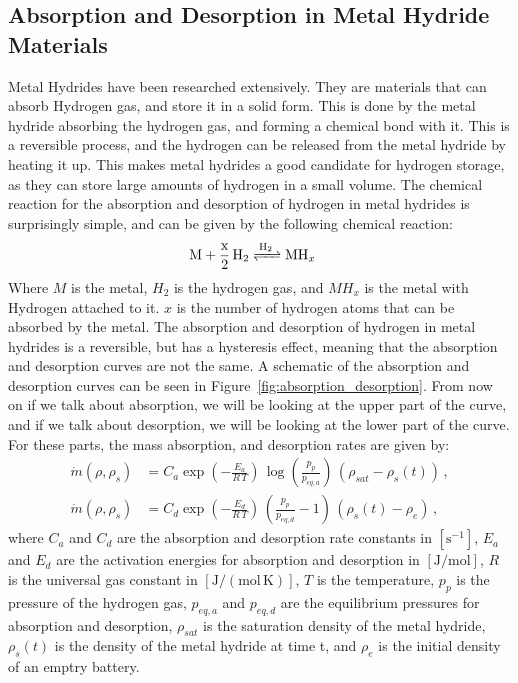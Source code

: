 \subsection{Absorption and Desorption in Metal Hydride Materials}\label{subsec:metal_hydrides}

Metal Hydrides have been researched extensively. They are materials that can absorb Hydrogen gas, and store it in a solid form. This is done by the metal hydride absorbing the hydrogen gas, and forming a chemical bond with it. This is a reversible process, and the hydrogen can be released from the metal hydride by heating it up. This makes metal hydrides a good candidate for hydrogen storage, as they can store large amounts of hydrogen in a small volume. The chemical reaction for the absorption and desorption of hydrogen in metal hydrides is surprisingly simple, and can be given by the following chemical reaction\cite{Sandrock1999}:
\begin{align*}
    \ce{M + \frac{x}{2} H2 &<=>[\ce{H2}] MH_x}
\end{align*}
Where $M$ is the metal, $H_2$ is the hydrogen gas, and $MH_x$ is the metal with Hydrogen attached to it. $x$ is the number of hydrogen atoms that can be absorbed by the metal. The absorption and desorption of hydrogen in metal hydrides is a reversible, but has a hysteresis effect, meaning that the absorption and desorption curves are not the same. A schematic of the absorption and desorption curves can be seen in Figure~\ref{fig:absorption_desorption}. From now on if we talk about absorption,  we will be looking at the upper part of the curve, and if we talk about desorption, we will be looking at the lower part of the curve. For these parts, the mass absorption, and desorption rates are given by\cite{Jemni1995}:
\begin{align}
    \label{eq:phy_abs}
    \dot m(\rho, \rho_s) &= C_a \exp(- \frac{E_a}{R \, T}) \,
    \log( \frac{p_p}{p_{eq,a}} ) \, (\rho_{sat} - \rho_s(t)) \, ,\\
    \label{eq:phy_des}
    \dot m(\rho, \rho_s) &= C_d \exp(- \frac{E_d}{R \, T}) \,
    (\frac{p_p}{p_{eq,d}} - 1) \, (\rho_s(t) - \rho_{e}) \, ,
\end{align}
where $C_a$ and $C_d$ are the absorption and desorption rate constants in $[\mathrm{s^{-1}}]$, $E_a$ and $E_d$ are the activation energies for absorption and desorption in $[\mathrm{J/mol}]$, $R$ is the universal gas constant in $[\mathrm{J/(mol \, K)}]$, $T$ is the temperature, $p_p$ is the pressure of the hydrogen gas, $p_{eq,a}$ and $p_{eq,d}$ are the equilibrium pressures for absorption and desorption, $\rho_{sat}$ is the saturation density of the metal hydride, $\rho_s(t)$ is the density of the metal hydride at time t, and $\rho_{e}$ is the initial density of an emptry battery.


